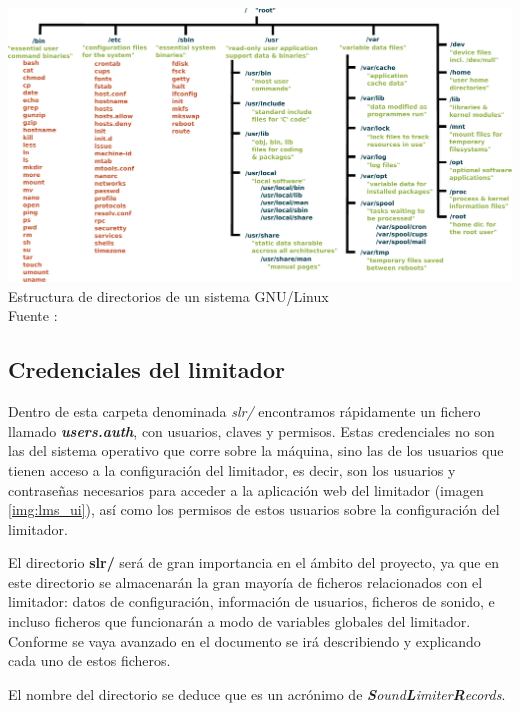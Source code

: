 \begin{center}
    \includegraphics[scale=0.5]{figuras/unix_filesystem_hierarchy.pdf}
    {
        Estructura de directorios de un sistema \gls{GNU/Linux} \\
        Fuente : \cite{wikipedia}
    }
    \label{fig:dirs_linux}
\end{center}

\subsection{Credenciales del limitador}

Dentro de esta carpeta denominada \textit{slr/} encontramos rápidamente un fichero llamado \textbf{\textit{users.auth}}, con usuarios, claves y permisos. Estas credenciales no son las del sistema operativo que corre sobre la máquina, sino las de los usuarios que tienen acceso a la configuración del limitador, es decir, son los usuarios y contraseñas necesarios para acceder a la aplicación web del limitador (imagen \ref{img:lms_ui}), así como los permisos de estos usuarios sobre la configuración del limitador.

\begin{shaded}
    \noindent
    El directorio \textbf{slr/} será de gran importancia en el ámbito del proyecto, ya que en este directorio se almacenarán la gran mayoría de ficheros relacionados con el limitador: datos de configuración, información de usuarios, ficheros de sonido, e incluso ficheros que funcionarán a modo de variables globales del limitador. Conforme se vaya avanzado en el documento se irá describiendo y explicando cada uno de estos ficheros.
    \par
    \noindent
    El nombre del directorio se deduce que es un acrónimo de \textit{\textbf{S}ound\textbf{L}imiter\textbf{R}ecords}.
\end{shaded}

